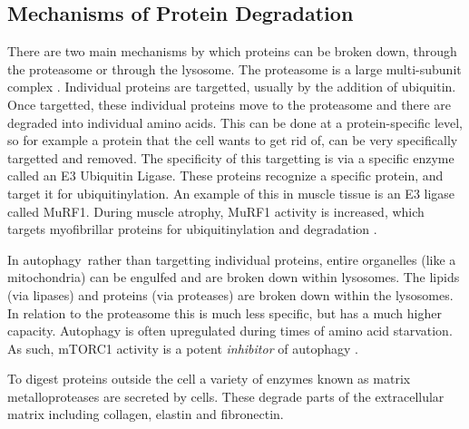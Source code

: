 \documentclass{tufte-handout}
\begin{document}
\subsection{Mechanisms of Protein Degradation}

There are two main mechanisms by which proteins can be broken down, through the proteasome or through the lysosome.  The proteasome is a large multi-subunit complex \citep{Finley2009}.  Individual proteins are targetted, usually by the addition of ubiquitin.  Once targetted, these individual proteins move to the proteasome and there are degraded into individual amino acids.  This can be done at a protein-specific level, so for example a protein that the cell wants to get rid of, can be very specifically targetted and removed.  The specificity of this targetting is via a specific enzyme called an E3 Ubiquitin Ligase.  These proteins recognize a specific protein, and target it for ubiquitinylation.  An example of this in muscle tissue is an E3 ligase called MuRF1.  During muscle atrophy, MuRF1 activity is increased, which targets myofibrillar proteins for ubiquitinylation and degradation \citep{Bodine2014}.  

  In autophagy\, rather than targetting individual proteins, entire organelles (like a mitochondria) can be engulfed and are broken down within lysosomes.  The lipids (via lipases) and proteins (via proteases) are broken down within the lysosomes.  In relation to the proteasome this is much less specific, but has a much higher capacity.  Autophagy is often upregulated during times of amino acid starvation.  As such, mTORC1 activity is a potent \emph{inhibitor} of autophagy \citep{Noda1998}.

  To digest proteins outside the cell a variety of enzymes known as matrix metalloproteases are secreted by cells.  These degrade parts of the extracellular matrix including collagen, elastin and fibronectin.
\end{document}
